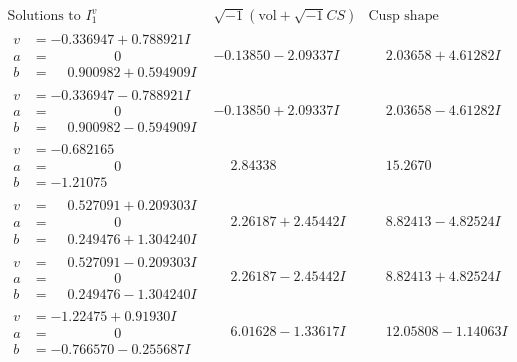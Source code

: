 \documentclass[1p]{elsarticle_modified}
\theoremstyle{definition}
\newcommand{\I}{\sqrt{-1}}
\begin{document}
$$\begin{array}{c|c|c}  
\text{Solutions to }I^v_{1}& \I (\text{vol} + \sqrt{-1}CS) & \text{Cusp shape}\\
 \hline 
\begin{aligned}
v &= -0.336947 + 0.788921 I \\
a &= \phantom{-0.000000 } 0 \\
b &= \phantom{-}0.900982 + 0.594909 I\end{aligned}
 & -0.13850 - 2.09337 I & \phantom{-}2.03658 + 4.61282 I \\ \hline\begin{aligned}
v &= -0.336947 - 0.788921 I \\
a &= \phantom{-0.000000 } 0 \\
b &= \phantom{-}0.900982 - 0.594909 I\end{aligned}
 & -0.13850 + 2.09337 I & \phantom{-}2.03658 - 4.61282 I \\ \hline\begin{aligned}
v &= -0.682165\phantom{ +0.000000I} \\
a &= \phantom{-0.000000 } 0 \\
b &= -1.21075\phantom{ +0.000000I}\end{aligned}
 & \phantom{-}2.84338\phantom{ +0.000000I} & \phantom{-}15.2670\phantom{ +0.000000I} \\ \hline\begin{aligned}
v &= \phantom{-}0.527091 + 0.209303 I \\
a &= \phantom{-0.000000 } 0 \\
b &= \phantom{-}0.249476 + 1.304240 I\end{aligned}
 & \phantom{-}2.26187 + 2.45442 I & \phantom{-}8.82413 - 4.82524 I \\ \hline\begin{aligned}
v &= \phantom{-}0.527091 - 0.209303 I \\
a &= \phantom{-0.000000 } 0 \\
b &= \phantom{-}0.249476 - 1.304240 I\end{aligned}
 & \phantom{-}2.26187 - 2.45442 I & \phantom{-}8.82413 + 4.82524 I \\ \hline\begin{aligned}
v &= -1.22475 + 0.91930 I \\
a &= \phantom{-0.000000 } 0 \\
b &= -0.766570 - 0.255687 I\end{aligned}
 & \phantom{-}6.01628 - 1.33617 I & \phantom{-}12.05808 - 1.14063 I \\ \hline\begin{aligned}

\end{aligned}
\end{array}$$
\end{document}
